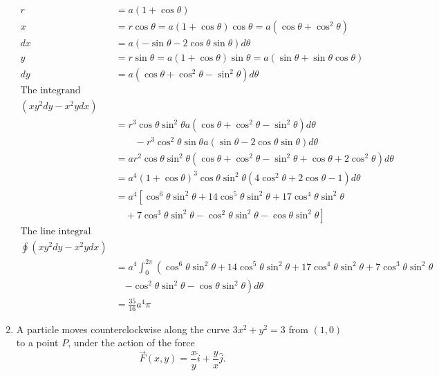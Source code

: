 \begin{enumerate}
\begin{answer}
\begin{figure}[H]
	\end{figure}
	\begin{align*}
	r&=a(1+\cos \theta)\\
	x&=r \cos \theta=a(1+\cos \theta) \cos \theta=a\left(\cos \theta+\cos ^{2} \theta\right)\\
	d x&=a(-\sin \theta-2 \cos \theta \sin \theta) d \theta\\
	y &=r \sin \theta=a(1+\cos \theta) \sin \theta=a(\sin \theta+\sin \theta \cos \theta) \\ d y &=a\left(\cos \theta+\cos ^{2} \theta-\sin ^{2} \theta\right) d \theta \\
	\text{The integrand}&\\
	\left(x y^{2} d y-x^{2} y d x\right)&\\
	&=r^{3} \cos \theta \sin ^{2} \theta a\left(\cos \theta+\cos ^{2} \theta-\sin ^{2} \theta\right) d \theta\\
	&\quad \quad-r^{3} \cos ^{2} \theta \sin \theta a(\sin \theta-2 \cos \theta \sin \theta) d \theta\\
	&=a r^{2} \cos \theta \sin ^{2} \theta\left(\cos \theta+\cos ^{2} \theta-\sin ^{2} \theta+\cos \theta+2 \cos ^{2} \theta\right) d \theta\\
	&=a^{4}(1+\cos \theta)^{3} \cos \theta \sin ^{2} \theta\left(4 \cos ^{2} \theta+2 \cos \theta-1\right) d \theta\\
	&=a^{4}\left[\cos ^{6} \theta \sin ^{2} \theta+14 \cos ^{5} \theta \sin ^{2} \theta+17 \cos ^{4} \theta \sin ^{2} \theta\right.\\
	&\left.\quad+7 \cos ^{3} \theta \sin ^{2} \theta-\cos ^{2} \theta \sin ^{2} \theta-\cos \theta \sin ^{2} \theta\right]\\
	\text{The line integral}&\\
	\oint\left(x y^{2} d y-x^{2} y d x\right)&\\
	&=a^{4} \int_{0}^{2 \pi}\left(\cos ^{6} \theta \sin ^{2} \theta+14 \cos ^{5} \theta \sin ^{2} \theta+17 \cos ^{4} \theta \sin ^{2} \theta+7 \cos ^{3} \theta \sin ^{2} \theta\right.\\
	&\quad \left.-\cos ^{2} \theta \sin ^{2} \theta-\cos \theta \sin ^{2} \theta\right) d \theta\\
	&=\frac{35}{16} a^{4} \pi
	\end{align*}
\end{answer}
\item A particle moves counterclockwise along the curve $3 x^{2}+y^{2}=3$ from $(1,0)$ to a point $P$, under the action of the force
$$
\vec{F}(x, y)=\frac{x}{y} \hat{i}+\frac{y}{x} \hat{j} .
$$
\end{enumerate}
